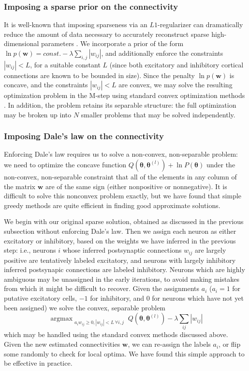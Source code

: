 \documentclass[aoas,preprint]{imsart}
\newcommand{\bth}{\mathbf{\theta}}
\newcommand{\w}{w}
\newcommand{\bw}{\mathbf{\w}}
\DeclareMathOperator*{\argmax}{argmax}
\begin{document}
\subsubsection{Imposing a sparse prior on the connectivity}

It is well-known that imposing sparseness via an $L1$-regularizer can
dramatically reduce the amount of data necessary to accurately
reconstruct sparse high-dimensional parameters
\cite{Tibs96,TIP01,DE03,NG04,Candes2008,Mishchenko2009}. We
incorporate a prior of the form $\ln p(\bw) = const. - \lambda
\sum_{i,j} |\w_{ij}|$, and additionally enforce the constraints
$|\w_{ij}|<L$, for a suitable constant $L$ (since both excitatory and
inhibitory cortical connections are known to be bounded in
size). Since the penalty $\ln p(\bw)$ is concave, and the constraints
$|\w_{ij}|<L$ are convex, we may solve the resulting optimization
problem in the M-step using standard convex optimization methods
\cite{CONV04}. In addition, the problem retains its separable
structure: the full optimization may be broken up into $N$ smaller
problems that may be solved independently.

\subsubsection{Imposing Dale's law on the connectivity}

Enforcing Dale's law requires us to solve a non-convex, non-separable
problem: we need to optimize the concave function $Q(\bth,\bth^{(l)})
+ \ln P(\bth)$ under the non-convex, non-separable constraint that all
of the elements in any column of the matrix $\bw$ are of the same sign
(either nonpositive or nonnegative). It is difficult to solve this
nonconvex problem exactly, but we have found that simple greedy
methods are quite efficient in finding good approximate solutions.

We begin with our original sparse solution, obtained as discussed in
the previous subsection without enforcing Dale's law. Then we assign
each neuron as either excitatory or inhibitory, based on the weights
we have inferred in the previous step: i.e., neurons $i$ whose
inferred postsynaptic connections $w_{ij}$ are largely positive are
tentatively labeled excitatory, and neurons with largely inhibitory
inferred postsynapic connections are labeled inhibitory. Neurons which
are highly ambiguous may be unassigned in the early iterations, to
avoid making mistakes from which it might be difficult to
recover. Given the assignments $a_i$ ($a_i =1$ for putative excitatory
cells, $-1$ for inhibitory, and $0$ for neurons which have not yet
been assigned) we solve the convex, separable problem \begin{equation}
\argmax_{\substack{a_i \w_{ij} \geq 0, |w_{ij}|<L ~ \forall i,j}}
Q(\bth,\bth^{(l)}) - \lambda \sum_{ij} |w_{ij}| \end{equation} which
may be handled using the standard convex methods discussed
above. Given the new estimated connectivities $\bw$, we can re-assign
the labels $a_i$, or flip some randomly to check for local optima. We
have found this simple approach to be effective in practice.
\end{document}
